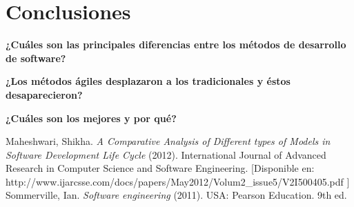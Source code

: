 \documentclass[spanish,12pt,letterpapper]{article}
\begin{document}
	\section{Conclusiones}
	
    \textbf{¿Cuáles son las principales diferencias entre los métodos de desarrollo de software?}
    
    \textbf{¿Los métodos ágiles desplazaron a los tradicionales y éstos desaparecieron?}
    
    \textbf{¿Cuáles son los mejores y por qué?} 
	
	\pagebreak
	\begin{thebibliography}{9}
	  Maheshwari, Shikha. 
		\emph{A Comparative Analysis of Different types of Models in Software Development Life Cycle} (2012). International Journal of Advanced Research in Computer Science and Software Engineering. [Disponible en: http://www.ijarcsse.com/docs/papers/May2012/Volum2\_issue5/V2I500405.pdf ]
		  Sommerville, Ian. 
		\emph{Software engineering} (2011). USA:  Pearson Education. 9th ed. 
		
	\end{thebibliography}
	
	
	
	
\end{document}

